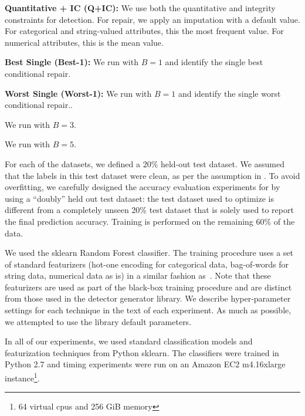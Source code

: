 \vspace{0.25em}\noindent\textbf{Quantitative + IC (Q+IC): } We use both the quantitative and integrity constraints for detection. For repair, we apply an imputation with a default value. For categorical and string-valued attributes, this the most frequent value. For numerical attributes, this is the mean value.

\vspace{0.25em}\noindent\textbf{Best Single (Best-1): } We run \sys with $B=1$ and identify the  single best conditional repair.

\vspace{0.25em}\noindent\textbf{Worst Single (Worst-1): } We run \sys with $B=1$ and identify the single worst conditional repair..

 We run \sys with $B=3$.

 We run \sys with $B=5$.


\vspace{0.25em}

 For each of the datasets, we defined a 20\% held-out test dataset. We assumed that the labels in this test dataset were clean, as per the assumption in \sys. To avoid overfitting, we carefully designed the accuracy evaluation experiments for \sys by using a ``doubly'' held out test dataset: the test dataset used to optimize \sys is different from a completely unseen 20\% test dataset that is solely used to report the final prediction accuracy.
Training is performed on the remaining 60\% of the data.

 We used the \textsf{sklearn} Random Forest classifier.  The training procedure uses a set of standard featurizers (hot-one encoding for categorical data, bag-of-words for string data, numerical data as is) in a similar fashion as~\cite{DBLP:conf/sigmod/GokhaleDDNRSZ14}.  Note that these featurizers are used as part of the black-box training procedure and are distinct from those used in the detector generator library. 
We describe hyper-parameter settings for each technique in the text of each experiment.
As much as possible, we attempted to use the library default parameters.

 In all of our experiments, we used standard classification models and featurization techniques from Python \textsf{sklearn}.
The classifiers were trained in Python 2.7 and timing experiments were run on an Amazon EC2 m4.16xlarge instance\footnote{64 virtual cpus and 256 GiB memory}.



